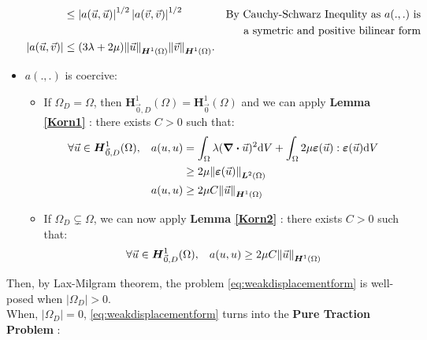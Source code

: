 \documentclass[a4paper,12pt,twoside]{report}
\newcommand{\dif}{\mathrm{d}}
\begin{document}
\begin{itemize}
\begin{equation*}
\begin{aligned}
        & \leq \left| a(\vec u, \vec u) \right|^{1/2} \left| a(\vec v, \vec v) \right|^{1/2} & \text{By Cauchy-Schwarz Inequlity as $a(.,.)$ is} \\
        & & \text{a symetric and positive bilinear form} \\
        \left| a(\vec u, \vec v) \right| & \leq (3\lambda + 2\mu)\norm{\vec u}_{\boldsymbol H^1(\Omega)}\norm{\vec v}_{\boldsymbol H^1(\Omega)}.
        \end{aligned}
    \end{equation*}
    \item $a(.,.)$ is coercive: 
        \begin{itemize}
            \item If $\Omega_D = \Omega$, then $\boldsymbol H^1_{\vec 0,D}(\Omega) = \boldsymbol H^1_{\vec 0}(\Omega)$ and we can apply \textbf{Lemma \ref{Korn1}} : there exists $C > 0$ such that:
            \begin{equation*}
                \begin{aligned}
                    \forall \vec u \in \boldsymbol H^1_{\vec 0,D}(\Omega), \hspace{0.3cm} a(u,u) 
                    &= \int_\Omega \lambda (\div \vec u)^2 \dif V + \int_\Omega 2\mu \boldsymbol \varepsilon(\vec u): \boldsymbol \varepsilon (\vec u)\dif V \\
                    & \geq 2\mu \norm{\boldsymbol \varepsilon(\vec u)}_{\boldsymbol{L}^2(\Omega)} \\
                    a(u,u) & \geq 2\mu C \norm{\vec u}_{\boldsymbol{H}^1(\Omega)}
                \end{aligned}
            \end{equation*}
            \item If $\Omega_D \subsetneq \Omega$, we can now apply \textbf{Lemma \ref{Korn2}} : there exists $C >0$ such that:
            $$\forall \vec u \in \boldsymbol H^1_{\vec 0,D}(\Omega), \hspace{0.3cm}a(u,u) \geq 2\mu C \norm{\vec u}_{\boldsymbol{H}^1(\Omega)}$$
        \end{itemize}
\end{itemize}

Then, by Lax-Milgram theorem, the problem \eqref{eq:weakdisplacementform} is well-posed when $\left| \Omega_D \right| > 0$. \\
When, $\left| \Omega_D \right| = 0$, \eqref{eq:weakdisplacementform} turns into the\textbf{ Pure Traction Problem} : 
\end{document}
